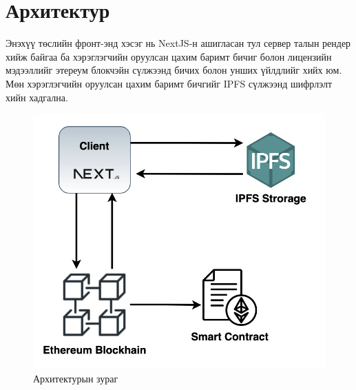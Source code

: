 \newpage
\section{Архитектур}
Энэхүү төслийн фронт-энд хэсэг нь NextJS-н ашигласан тул сервер талын рендер хийж байгаа ба хэрэглэгчийн оруулсан цахим баримт бичиг болон лицензийн мэдээллийг этереум блокчэйн сүлжээнд бичих болон унших үйлдлийг хийх юм. Мөн хэрэглэгчийн оруулсан цахим баримт бичгийг IPFS сүлжээнд шифрлэлт хийн хадгална.

\begin{figure}[h!]
	\centering
	\includegraphics[scale=0.4]{src/images/architecture.png}
	\caption{Архитектурын зураг}
\end{figure}
